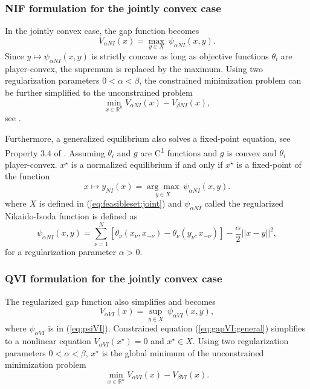 \documentclass[11pt]{article}
\newcommand{\expo}{\textsuperscript}
\newcommand{\R}{\ensuremath{\mathbb{R}}}
\begin{document}
\subsubsection{NIF formulation for the jointly convex case}

In the jointly convex case, the gap function becomes
$$
V_{\alpha NI}(x)= \underset{ y \in X }{\max}~ \psi_{\alpha NI}(x,y).
$$
Since $y\mapsto \psi_{\alpha NI}(x,y)$ is strictly concave as long as objective functions $\theta_i$ are player-convex, the supremum is replaced by the maximum. 
Using two regularization parameters $0<\alpha<\beta$, the constrained minimization problem can be further simplified to the unconstrained problem
\begin{equation}
\underset{x\in\R^n}{\min} V_{\alpha NI}(x)-V_{\beta NI}(x),
\label{eq:gapNIab:joint}
\end{equation}
see \cite{heusingerkanzow}.


Furthermore, a generalized equilibrium also solves a fixed-point equation, see Property 3.4 of \cite{heusingerkanzow}.
Assuming $\theta_i$ and $g$ are C\expo{1} functions and $g$ is convex and $\theta_i$ player-convex. $x^\star$ is a normalized equilibrium if and only if $x^\star$ is a fixed-point of the function
\begin{equation}
x \mapsto y_{NI}(x) = \underset{y\in X}{\arg\max}~ \psi_{\alpha NI}(x, y).
\label{eq:fpNIa:joint}
\end{equation}
where $X$ is defined in (\ref{eq:feasibleset:joint}) and $\psi_{\alpha NI}$ called the regularized Nikaido-Isoda function is defined as
\begin{equation}
\psi_{\alpha NI}(x, y) = \sum_{\nu = 1}^N [ \theta_\nu(x_\nu, x_{-\nu}) -  \theta_\nu(y_\nu, x_{-\nu}) ] - \frac{\alpha}{2} ||x-y||^2,
\label{eq:psiregNI}
\end{equation}
for a regularization parameter $\alpha>0$.

\subsubsection{QVI formulation for the jointly convex case}

The regularized gap function also simplifies and becomes
$$
V_{\alpha VI}(x) = \underset{y\in X}{\sup}~\psi_{\alpha VI}(x, y),
$$
where $\psi_{\alpha VI}$ is in (\ref{eq:psiVI}).
Constrained equation (\ref{eq:gapVI:general}) simplifies to a nonlinear equation
$V_{\alpha VI}(x^\star)=0$ and $x^\star \in X$.
Using two regularization parameters $0<\alpha<\beta$, $x^\star$ is the global minimum of the unconstrained minimization problem 
\begin{equation}
\underset{x\in\R^n}{\min} V_{\alpha VI}(x)-V_{\beta VI}(x).
\label{eq:gapVIab:joint}
\end{equation}
\end{document}
